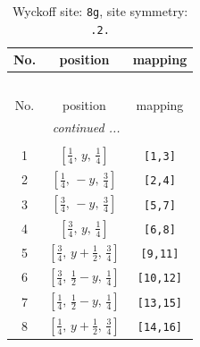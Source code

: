 \documentclass[fleqn,8pt]{jsarticle}
\begin{document}
\renewcommand{\arraystretch}{1.2}
\begin{longtable}{ccc}
\caption{Wyckoff site: {\tt 8g}, site symmetry: {\tt .2.}}
 \\
 \hline \hline
No. & position & mapping \\ \hline \endfirsthead

\multicolumn{2}{l}{\tablename\ \thetable{}} \\
 \hline \hline
No. & position & mapping \\ \hline \endhead

 \hline \hline
\multicolumn{2}{r}{\footnotesize\it continued ...} \\ \endfoot

 \hline \hline
\multicolumn{2}{r}{} \\ \endlastfoot

1 & $\left[ \frac{1}{4},\, y,\, \frac{1}{4} \right]$ & {\tt [1,3]} \\ \hline
2 & $\left[ \frac{1}{4},\, - y,\, \frac{3}{4} \right]$ & {\tt [2,4]} \\ \hline
3 & $\left[ \frac{3}{4},\, - y,\, \frac{3}{4} \right]$ & {\tt [5,7]} \\ \hline
4 & $\left[ \frac{3}{4},\, y,\, \frac{1}{4} \right]$ & {\tt [6,8]} \\ \hline
5 & $\left[ \frac{3}{4},\, y + \frac{1}{2},\, \frac{3}{4} \right]$ & {\tt [9,11]} \\ \hline
6 & $\left[ \frac{3}{4},\, \frac{1}{2} - y,\, \frac{1}{4} \right]$ & {\tt [10,12]} \\ \hline
7 & $\left[ \frac{1}{4},\, \frac{1}{2} - y,\, \frac{1}{4} \right]$ & {\tt [13,15]} \\ \hline
8 & $\left[ \frac{1}{4},\, y + \frac{1}{2},\, \frac{3}{4} \right]$ & {\tt [14,16]} \\
\end{longtable}
\renewcommand{\arraystretch}{1.2}
\end{document}
